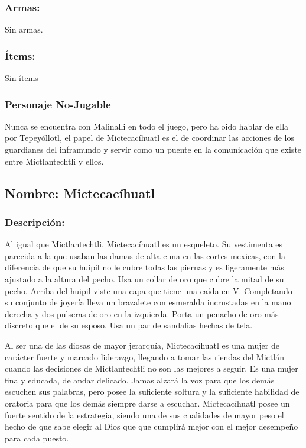 \documentclass[11pt,letterpaper]{article}
\begin{document}
        \subsubsection{Armas:}
Sin armas.
        \subsubsection{Ítems:}
Sin ítems
        \subsubsection{Personaje No-Jugable}
Nunca se encuentra con Malinalli en todo el juego, pero ha oido hablar de ella por Tepeyóllotl, el papel de Mictecacíhuatl es el de coordinar las acciones de los guardianes del inframundo y servir como un puente en la comunicación que existe entre Mictlantechtli y ellos.


\subsection{Nombre: Mictecacíhuatl}  
\subsubsection{Descripción:}   
Al igual que Mictlantechtli,  Mictecacíhuatl es un esqueleto. Su vestimenta es parecida a la que usaban las damas de alta cuna en las cortes mexicas, con la diferencia de que su huipil no le cubre todas las piernas y es ligeramente más ajustado a la altura del pecho. Usa un collar de oro que cubre la mitad de su pecho. Arriba del huipil viste una capa que tiene una caída en V. Completando su conjunto de joyería lleva un brazalete con esmeralda incrustadas en la mano derecha y dos pulseras de oro en la izquierda. Porta un penacho de oro más discreto que el de su esposo. Usa un par de sandalias hechas de tela.
\\
\par
Al ser una de las diosas de mayor jerarquía,  Mictecacíhuatl es una mujer de  carácter fuerte y marcado liderazgo, llegando a tomar las riendas del Mictlán cuando las decisiones de  Mictlantechtli no son las mejores a seguir. Es una mujer fina y educada, de andar delicado. Jamas alzará la voz para que los demás escuchen sus palabras, pero posee la suficiente soltura y la suficiente habilidad de oratoria para que los demás siempre darse a escuchar. Mictecacíhuatl posee un fuerte sentido de la estrategia, siendo una de sus cualidades de mayor peso el hecho de que sabe elegir al Dios que que cumplirá mejor con el mejor desempeño para cada puesto. 
\end{document}
